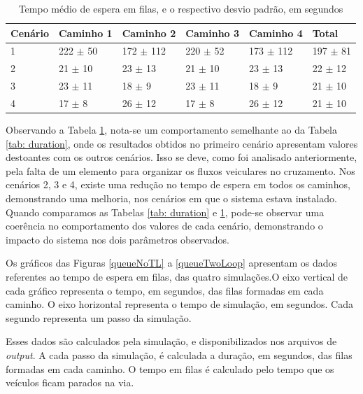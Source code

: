 \begin{table}[H]
\centering
\caption{Tempo médio de espera em filas, e o respectivo desvio padrão, em segundos}
\label{tab: queue}
\begin{tabular}{@{}llllll@{}}
\toprule
Cenário & Caminho 1 & Caminho 2 & Caminho 3 & Caminho 4 & Total \\ \midrule
1 & 222 $\pm$ 50 & 172 $\pm$ 112 & 220 $\pm$ 52 & 173 $\pm$ 112 & 197 $\pm$ 81 \\
2 & 21 $\pm$ 10 & 23 $\pm$ 13 & 21 $\pm$ 10 & 23 $\pm$ 13 & 22 $\pm$ 12 \\
3 &	23 $\pm$ 11 & 18 $\pm$ 9 & 23 $\pm$ 11 & 18 $\pm$ 9 & 21 $\pm$ 10 \\
4 & 17 $\pm$ 8 & 26 $\pm$ 12 & 17 $\pm$ 8 & 26 $\pm$ 12 & 21 $\pm$ 10 \\
\bottomrule
\end{tabular}
\end{table}

Observando a Tabela \ref{tab: queue}, nota-se um comportamento semelhante ao da Tabela \ref{tab: duration}, onde os resultados obtidos no primeiro cenário apresentam valores destoantes com os outros cenários. Isso se deve, como foi analisado anteriormente, pela falta de um elemento para organizar os fluxos veiculares no cruzamento. Nos cenários 2, 3 e 4, existe uma redução no tempo de espera em todos os caminhos, demonstrando uma melhoria, nos cenários em que o sistema estava instalado. Quando comparamos as Tabelas \ref{tab: duration} e \ref{tab: queue}, pode-se observar uma coerência no comportamento dos valores de cada cenário, demonstrando o impacto do sistema nos dois parâmetros observados.

Os gráficos das Figuras \ref{queueNoTL} a \ref{queueTwoLoop}  apresentam os dados referentes ao tempo de espera em filas, das quatro simulações.O eixo vertical de cada gráfico representa o tempo, em segundos, das filas formadas em cada caminho. O eixo horizontal representa o tempo de simulação, em segundos. Cada segundo representa um passo da simulação.

Esses dados são calculados pela simulação, e disponibilizados nos arquivos de \textit{output}. A cada passo da simulação, é calculada a duração, em segundos, das filas formadas em cada caminho. O tempo em filas é calculado pelo tempo que os veículos ficam parados na via.

